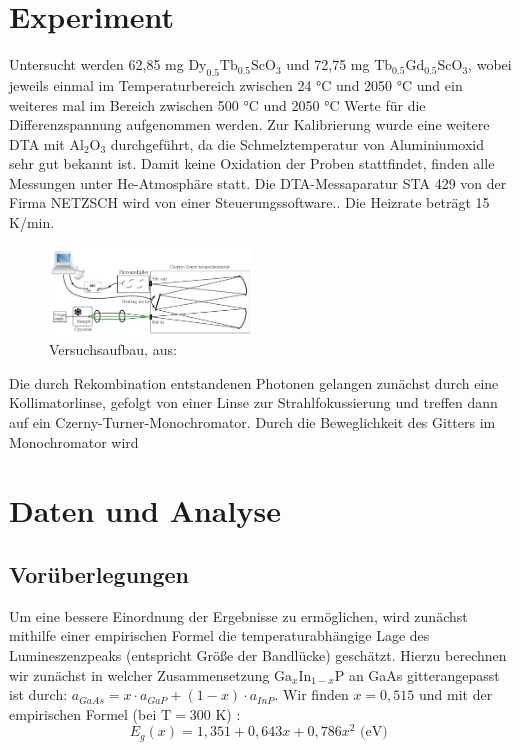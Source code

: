 \documentclass[aps,twocolumn,secnumarabic,nobalancelastpage,amsmath,amssymb,
nofootinbib,superscriptaddress]{revtex4-1}
\begin{document}

\section{Experiment}
\noindent Untersucht werden 62,85 mg $\text{Dy}_{0.5}\text{Tb}_{0.5}\text{ScO}_3$ und 72,75 mg $\text{Tb}_{0.5}\text{Gd}_{0.5}\text{ScO}_3$, wobei jeweils einmal im Temperaturbereich zwischen 24 °C und 2050 °C
und ein weiteres mal im Bereich zwischen 500 °C und 2050 °C Werte für die Differenzspannung aufgenommen werden. Zur Kalibrierung wurde eine weitere DTA mit $\text{Al}_2\text{O}_3$
durchgeführt, da die Schmelztemperatur von Aluminiumoxid sehr gut bekannt ist. Damit keine Oxidation der Proben stattfindet, finden alle Messungen unter He-Atmosphäre statt.
Die DTA-Messaparatur STA 429 von der Firma NETZSCH wird von einer Steuerungssoftware.. Die Heizrate beträgt 15 K/min.



\begin{figure}[h]
  \centering
  \includegraphics[width=0.48\textwidth]{img/versuchsanleitung.jpg}
  \caption{Versuchsaufbau, aus: \cite{anleitung}}
  \label{fig:versuch}
\end{figure}

\noindent Die durch Rekombination entstandenen Photonen gelangen zunächst durch eine Kollimatorlinse, gefolgt von einer Linse zur
Strahlfokussierung und treffen dann auf ein Czerny-Turner-Monochromator. Durch die Beweglichkeit des Gitters im Monochromator wird



\section{Daten und Analyse}
\subsection{Vorüberlegungen}

\noindent Um eine bessere Einordnung der Ergebnisse zu ermöglichen, wird zunächst mithilfe einer empirischen
Formel die temperaturabhängige Lage des Lumineszenzpeaks (entspricht Größe der Bandlücke) geschätzt.
Hierzu berechnen wir zunächst in welcher Zusammensetzung $\text{Ga}_x\text{In}_{1-x}\text{P}$
an GaAs gitterangepasst ist durch: $a_{GaAs} = x\cdot a_{GaP}+(1-x)\cdot a_{InP}$. Wir finden
$x=0,515$ und mit der empirischen Formel (bei $\text{T}=300\text{ K}$) \cite{vorbereitung}:
\begin{equation}
  E_{g}(x) = 1,351+0,643x+0,786x^2\text{ (eV) }
   \label{eq:Ex}
\end{equation}
\end{document}
